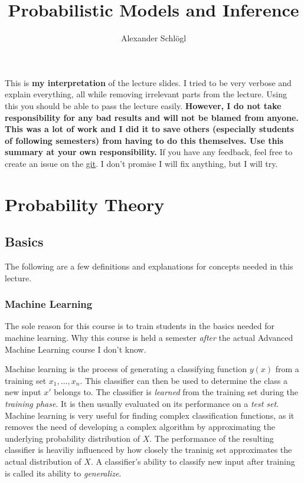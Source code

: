 \documentclass{article}
\title{Probabilistic Models and Inference}
\author{Alexander Schlögl}
\begin{document}
\maketitle

\tableofcontents

This is \textbf{my interpretation} of the lecture slides.
I tried to be very verbose and explain everything, all while removing irrelevant parts from the lecture.
Using this you should be able to pass the lecture easily.
\large{\textbf{However, I do not take responsibility for any bad results and will not be blamed from anyone.
This was a lot of work and I did it to save others (especially students of following semesters) from having to do this themselves.
Use this summary at your own responsibility.}}
If you have any feedback, feel free to create an issue on the \href{https://github.com/alxshine/lecture-notes}{git}.
I don't promise I will fix anything, but I will try.
\newpage

\section{Probability Theory}
\subsection{Basics}
The following are a few definitions and explanations for concepts needed in this lecture.

\subsubsection{Machine Learning}
The sole reason for this course is to train students in the basics needed for machine learning.
Why this course is held a semester \emph{after} the actual Advanced Machine Learning course I don't know.

Machine learning is the process of generating a classifying function $y(x)$ from a training set ${x_1, ..., x_n}$.
This classifier can then be used to determine the class a new input $x'$ belongs to.
The classifier is \emph{learned} from the training set during the \emph{training phase}.
It is then usually evaluated on its performance on a \emph{test set}.
Machine learning is very useful for finding complex classification functions, as it removes the need of developing a complex algorithm by approximating the underlying probability distribution of $X$.
The performance of the resulting classifier is heaviliy influenced by how closely the traninig set approximates the actual distribution of $X$.
A classifier's ability to classify new input after training is called its ability to \emph{generalize}.
\end{document}
